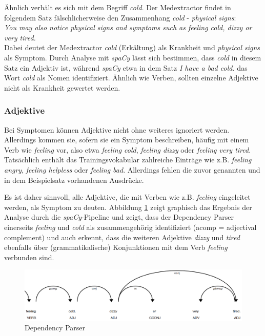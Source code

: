 Ähnlich verhält es sich mit dem Begriff \emph{cold}. Der Medextractor findet in folgendem Satz fälschlicherweise den Zusammenhang \emph{cold} - \emph {physical signs}:\\

\emph{\glqq You may also notice physical signs and symptoms such as feeling cold, dizzy or very tired.\grqq}\\

Dabei deutet der Medextractor \emph{cold} (Erkältung) als Krankheit und \emph{physical signs} als Symptom.  Durch Analyse mit \emph{spaCy} lässt sich bestimmen, dass \emph{cold} in diesem Satz ein Adjektiv ist, während \emph{spaCy} etwa in dem Satz \emph{\glqq I have a bad cold.\grqq} das Wort \emph{cold} als Nomen identifiziert. Ähnlich wie Verben, sollten einzelne Adjektive nicht als Krankheit gewertet werden.

\subsubsection{Adjektive}
\label{subsec: adjektiv} 

Bei Symptomen können Adjektive nicht ohne weiteres ignoriert werden. Allerdings kommen sie, sofern sie ein Symptom beschreiben, häufig mit einem Verb wie \emph{feeling} vor, also etwa \emph{feeling cold}, \emph{feeling dizzy} oder \emph{feeling very tired}. Tatsächlich enthält das Trainingsvokabular zahlreiche Einträge wie z.B. \emph{feeling angry}, \emph{feeling helpless} oder \emph{feeling bad}. Allerdings fehlen die zuvor genannten und in dem Beispielsatz vorhandenen Ausdrücke.

Es ist daher sinnvoll, alle Adjektive, die mit Verben wie z.B. \emph{feeling} eingeleitet werden, als Symptom zu deuten. Abbildung \ref{fig:dep_parser} zeigt graphisch das Ergebnis der Analyse durch die \emph{spaCy}-Pipeline und zeigt, dass der Dependency Parser einerseits \emph{feeling} und \emph{cold} als zusammengehörig identifiziert (acomp = adjectival complement) und auch erkennt, dass die weiteren Adjektive \emph{dizzy} und \emph{tired} ebenfalls über (grammatikalische) Konjunktionen mit dem Verb \emph{feeling} verbunden sind.

\begin{figure}[h]
    \centering
    \includegraphics[width=\textwidth]{pictures/Dep_Parser.png}
    \caption{Dependency Parser}
    \label{fig:dep_parser}
\end{figure}

